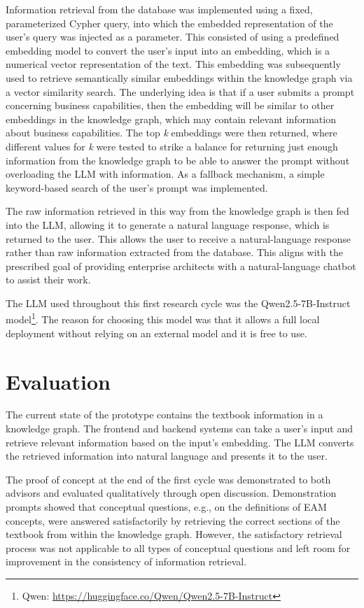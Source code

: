 Information retrieval from the database was implemented using a fixed, parameterized Cypher query, into which the embedded representation of the user’s query was injected as a parameter. This consisted of using a predefined embedding model to convert the user's input into an embedding, which is a numerical vector representation of the text. This embedding was subsequently used to retrieve semantically similar embeddings within the knowledge graph via a vector similarity search. The underlying idea is that if a user submits a prompt concerning business capabilities, then the embedding will be similar to other embeddings in the knowledge graph, which may contain relevant information about business capabilities. The top \textit{k} embeddings were then returned, where different values for \textit{k} were tested to strike a balance for returning just enough information from the knowledge graph to be able to answer the prompt without overloading the LLM with information. As a fallback mechanism, a simple keyword-based search of the user's prompt was implemented.

The raw information retrieved in this way from the knowledge graph is then fed into the LLM, allowing it to generate a natural language response, which is returned to the user. This allows the user to receive a natural-language response rather than raw information extracted from the database. This aligns with the prescribed goal of providing enterprise architects with a natural-language chatbot to assist their work.

The LLM used throughout this first research cycle was the Qwen2.5-7B-Instruct model\footnote{Qwen: \url{https://huggingface.co/Qwen/Qwen2.5-7B-Instruct}}. The reason for choosing this model was that it allows a full local deployment without relying on an external model and it is free to use.

\section{Evaluation}
\label{sec:cycle1_evaluation}
The current state of the prototype contains the textbook information in a knowledge graph. The frontend and backend systems can take a user's input and retrieve relevant information based on the input's embedding. The LLM converts the retrieved information into natural language and presents it to the user.

The proof of concept at the end of the first cycle was demonstrated to both advisors and evaluated qualitatively through open discussion. Demonstration prompts showed that conceptual questions, e.g., on the definitions of EAM concepts, were answered satisfactorily by retrieving the correct sections of the textbook from within the knowledge graph. However, the satisfactory retrieval process was not applicable to all types of conceptual questions and left room for improvement in the consistency of information retrieval.

